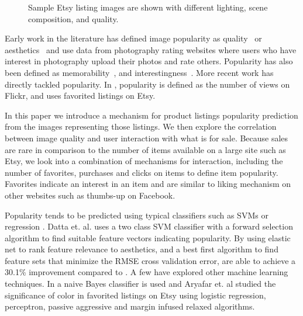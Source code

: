 \documentclass[conference,a4paper]{IEEEtran}
\begin{document}
\begin{figure}
  \caption{
  Sample Etsy listing images are shown with different lighting, scene composition, and quality.
  }
  \label{fig:etsylistings}
\end{figure}

Early work in the literature has defined image popularity as quality~\cite{ke2006design} or aesthetics~\cite{datta2006studying} and use data from photography rating websites where users who have interest in photography upload their photos and rate others. Popularity has also been defined as memorability~\cite{isola2011makes}, and interestingness~\cite{dhar2011high,gygli2013interestingness}.  More recent work has directly tackled popularity.  In \cite{khosla2014makes}, popularity is defined as the number of views on Flickr, and \cite{aryafar2014exploring} uses favorited listings on Etsy.


In this paper we introduce a mechanism for product listings popularity prediction from the images representing those listings. We then explore the correlation between image quality and user interaction with what is for sale. Because sales are rare in comparison to the number of items available on a large site such as Etsy, we look into a combination of mechanisms for interaction, including the number of favorites, purchases and clicks on items to define item popularity. Favorites indicate an interest in an item and are similar to liking mechanism on other websites such as thumbs-up on Facebook.

Popularity tends to be predicted using typical classifiers such as SVMs or regression \cite{datta2006studying} \cite{khosla2014makes} \cite{chen2014aesthetic} \cite{wang2015automatic}.  Datta et. al. \cite{datta2006studying} uses a two class SVM classifier with a forward selection algorithm to find suitable feature vectors indicating popularity.  By using elastic net to rank feature relevance to aesthetics, and a best first algorithm to find feature sets that minimize the RMSE cross validation error, \cite{wang2015automatic} are able to achieve a 30.1\% improvement compared to \cite{chen2014aesthetic}.  A few have explored other machine learning techniques.  In \cite{ke2006design} a naive Bayes classifier is used and Aryafar et. al \cite{aryafar2014exploring} studied the significance of color in favorited listings on Etsy using logistic regression, perceptron, passive aggressive and margin infused relaxed algorithms.
\end{document}
